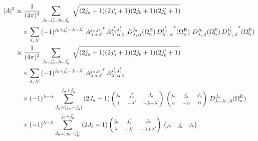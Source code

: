 \begin{subequations}\label{eq:ampSq}\begin{align}\label{eq:ampSqFirst}
  |A|^2 &\propto \frac{1}{(4\pi)^3}\,
           \sum_{j_a,\,j_a',\,j_b,\,j_b'}\
           \sqrt{(2j_a+1)(2j_a'+1)(2j_b+1)(2j_b'+1)}
           \nonumber\\&\quad\times
           \sum_{\lambda,\,\lambda'}\,
           (-1)^{j_b+j_b'-\lambda-\lambda'}\,
           {A_{\lambda\,\alpha\,\beta}^{j_a\,j_b}}^*\, A_{\lambda'\,\alpha\,\beta}^{j_a'\,j_b'}\
           D_{\lambda,\,\alpha}^{j_a}(\EulSet[a])\, {D_{\lambda',\,\alpha}^{j_a'}}^*(\EulSet[a])\
           D_{\lambda,\,\beta}^{j_b}(\EulSet[b])\, {D_{\lambda',\,\beta}^{j_b'}}^*(\EulSet[b])
           \\
        &\propto \frac{1}{(4\pi)^3}\,
           \sum_{j_a,\,j_a',\,j_b,\,j_b'}\
           \sqrt{(2j_a+1)(2j_a'+1)(2j_b+1)(2j_b'+1)}
           \nonumber\\&\quad\times
           \sum_{\lambda,\,\lambda'}\,
           (-1)^{j_b+j_b'-\lambda-\lambda'}\,
           {A_{\lambda\,\alpha\,\beta}^{j_a\,j_b}}^*\,A_{\lambda'\,\alpha\,\beta}^{j_a'\,j_b'}\,
           \nonumber\\&\quad\times
           (-1)^{\lambda-\alpha}
           \sum_{J_a=|j_a-j_a'|}^{j_a+j_a'} \left(2J_a+1\right)
           \begin{pmatrix}
             \mss{j_a} & \mss{j_a'} & \mss{J_a}\\
             \mss{\lambda} & \mss{-\lambda'} & \mss{-\lambda+\lambda'}
           \end{pmatrix}\,
           \begin{pmatrix}
             \mss{j_a} & \mss{j_a'} & \mss{J_a}\\
             \mss{\alpha} & \mss{-\alpha} & \mss{0}
           \end{pmatrix}\,
           D_{\lambda-\lambda',\,0}^{J_a}(\EulSet[a])
           \nonumber\\&\quad\times
           (-1)^{\lambda-\beta}
           \sum_{J_b=|j_b-j_b'|}^{j_b+j_b'} \left(2J_b+1\right)
           \begin{pmatrix}
             \mss{j_b} & \mss{j_b'} & \mss{J_b} \\
             \mss{\lambda} & \mss{-\lambda'} & \mss{-\lambda+\lambda'}
           \end{pmatrix}\,
           \begin{pmatrix}
             \mss{j_b} & \mss{j_b'} & \mss{J_b}\\

\end{pmatrix}
\end{align}
\end{subequations}
